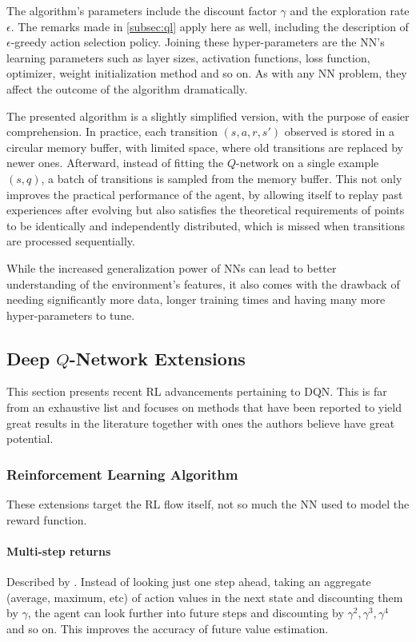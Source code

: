 \documentclass{article}
\begin{document}
The algorithm's parameters include the discount factor $\gamma$ and the exploration rate $\epsilon$. The remarks made in \ref{subsec:ql} apply here as well, including the description of $\epsilon$-greedy action selection policy. Joining these hyper-parameters are the NN's learning parameters such as layer sizes, activation functions, loss function, optimizer, weight initialization method and so on. As with any NN problem, they affect the outcome of the algorithm dramatically.

The presented algorithm is a slightly simplified version, with the purpose of easier comprehension. In practice, each transition $(s, a, r, s')$ observed is stored in a circular memory buffer, with limited space, where old transitions are replaced by newer ones. Afterward, instead of fitting the $Q$-network on a single example $(s, q)$, a batch of transitions is sampled from the memory buffer. This not only improves the practical performance of the agent, by allowing itself to replay past experiences after evolving but also satisfies the theoretical requirements of points to be identically and independently distributed, which is missed when transitions are processed sequentially.


While the increased generalization power of NNs can lead to better understanding of the environment's features, it also comes with the drawback of needing significantly more data,  longer training times and having many more hyper-parameters to tune.

\subsection{Deep $Q$-Network Extensions}
\label{subsec:dqnp}

This section presents recent RL advancements pertaining to DQN. This is far from an exhaustive list and focuses on methods that have been reported to yield great results in the literature together with ones the authors believe have great potential.

\subsubsection{Reinforcement Learning Algorithm}

These extensions target the RL flow itself, not so much the NN used to model the reward function.

\paragraph{Multi-step returns} Described by \cite{sutton}. Instead of looking just one step ahead, taking an aggregate (average, maximum, etc) of action values in the next state and discounting them by $\gamma$, the agent can look further into future steps and discounting by $\gamma^2, \gamma^3, \gamma^4$ and so on. This improves the accuracy of future value estimation.
\end{document}
